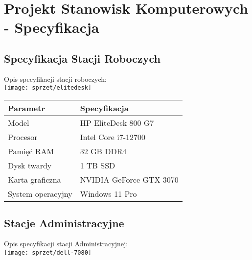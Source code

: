 \section{Projekt Stanowisk Komputerowych - Specyfikacja}

\subsection{Specyfikacja Stacji Roboczych}

    Opis specyfikacji stacji roboczych:\\
    \texttt{[image: sprzet/elitedesk]}
    \begin{flushleft}
        \begin{table}[h]
            \renewcommand{\arraystretch}{1.5}
            \begin{tabular}{|l|l|}
            \hline
                \textbf{Parametr} & \textbf{Specyfikacja} \\
            \hline
                Model & HP EliteDesk 800 G7 \\
                Procesor & Intel Core i7-12700 \\
                Pamięć RAM & 32 GB DDR4 \\
                Dysk twardy & 1 TB SSD \\
                Karta graficzna & NVIDIA GeForce GTX 3070 \\
                System operacyjny & Windows 11 Pro \\
            \hline
            \end{tabular}
        \end{table}  
    \end{flushleft}

\subsection{Stacje Administracyjne}

    Opis specyfikacji stacji Administracyjnej:\\
    \texttt{[image: sprzet/dell-7080]}


